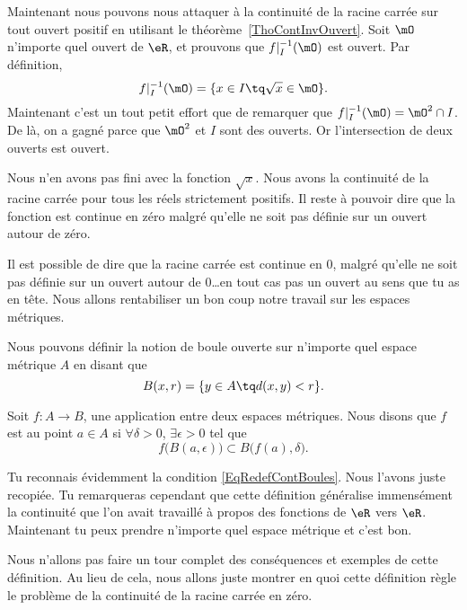 Maintenant nous pouvons nous attaquer à la continuité de la racine carrée sur tout ouvert positif en utilisant le théorème~\ref{ThoContInvOuvert}. Soit $\mO$ n'importe quel ouvert de $\eR$, et prouvons que $f|_I^{-1}(\mO)$ est ouvert. Par définition,
\begin{equation}
  f|_I^{-1}(\mO)=\{ x\in I\tq \sqrt{x}\in\mO \}.
\end{equation}
Maintenant c'est un tout petit effort que de remarquer que $f|_I^{-1}(\mO)=\mO^2\cap I$. De là, on a gagné parce que $\mO^2$ et $I$ sont des ouverts. Or l'intersection de deux ouverts est ouvert.

Nous n'en avons pas fini avec la fonction $\sqrt{x}$. Nous avons la continuité de la racine carrée pour tous les réels strictement positifs. Il reste à pouvoir dire que la fonction est continue en zéro malgré qu'elle ne soit pas définie sur un ouvert autour de zéro.

Il est possible de dire que la racine carrée est continue en $0$, malgré qu'elle ne soit pas définie sur un ouvert autour de $0$\ldots en tout cas pas un ouvert au sens que tu as en tête. Nous allons rentabiliser un bon coup notre travail sur les espaces métriques.

Nous pouvons définir la notion de boule ouverte sur n'importe quel espace métrique $A$ en disant que
\[
  B(x,r)=\{ y\in A\tq d(x,y)<r \}.
\]
\begin{definition}      \label{DefContMetrique}
Soit $f\colon A\to B$, une application entre deux espaces métriques. Nous disons que $f$ est  au point $a\in A$ si $\forall \delta>0$, $\exists\epsilon>0$ tel que
\begin{equation}
  f\big( B(a,\epsilon) \big)\subset B\big( f(a),\delta \big).
\end{equation}
\end{definition}
Tu reconnais évidemment la condition \eqref{EqRedefContBoules}. Nous l'avons juste recopiée. Tu remarqueras cependant que cette définition généralise immensément la continuité que l'on avait travaillé à propos des fonctions de $\eR$ vers $\eR$. Maintenant tu peux prendre n'importe quel espace métrique et c'est bon.

Nous n'allons pas faire un tour complet des conséquences et exemples de cette définition. Au lieu de cela, nous allons juste montrer en quoi cette définition règle le problème de la continuité de la racine carrée en zéro.

